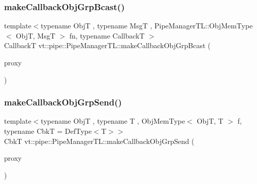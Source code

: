 \subsubsection{\texorpdfstring{make\+Callback\+Obj\+Grp\+Bcast()}{makeCallbackObjGrpBcast()}\hspace{0.1cm}{\footnotesize\ttfamily [2/2]}}
{\footnotesize\ttfamily template$<$typename ObjT , typename MsgT , Pipe\+Manager\+T\+L\+::\+Obj\+Mem\+Type$<$ Obj\+T, Msg\+T $>$ fn, typename CallbackT $>$ \\
CallbackT vt\+::pipe\+::\+Pipe\+Manager\+T\+L\+::make\+Callback\+Obj\+Grp\+Bcast (\begin{DoxyParamCaption}\item[{\hyperlink{structvt_1_1objgroup_1_1proxy_1_1_proxy}{objgroup\+::proxy\+::\+Proxy}$<$ ObjT $>$}]{proxy }\end{DoxyParamCaption})}

\mbox{\label{structvt_1_1pipe_1_1_pipe_manager_t_l_a98f92fd3f75e48766b55c7b7253c19b4}} 
\subsubsection{\texorpdfstring{make\+Callback\+Obj\+Grp\+Send()}{makeCallbackObjGrpSend()}\hspace{0.1cm}{\footnotesize\ttfamily [1/2]}}
{\footnotesize\ttfamily template$<$typename ObjT , typename T , Obj\+Mem\+Type$<$ Obj\+T, T $>$ f, typename CbkT  = Def\+Type$<$\+T$>$$>$ \\
CbkT vt\+::pipe\+::\+Pipe\+Manager\+T\+L\+::make\+Callback\+Obj\+Grp\+Send (\begin{DoxyParamCaption}\item[{\hyperlink{structvt_1_1objgroup_1_1proxy_1_1_proxy_elm}{objgroup\+::proxy\+::\+Proxy\+Elm}$<$ ObjT $>$}]{proxy }\end{DoxyParamCaption})}

\mbox{\label{structvt_1_1pipe_1_1_pipe_manager_t_l_a304681fe59bec2e1ad28a357f48aeab3}} 
